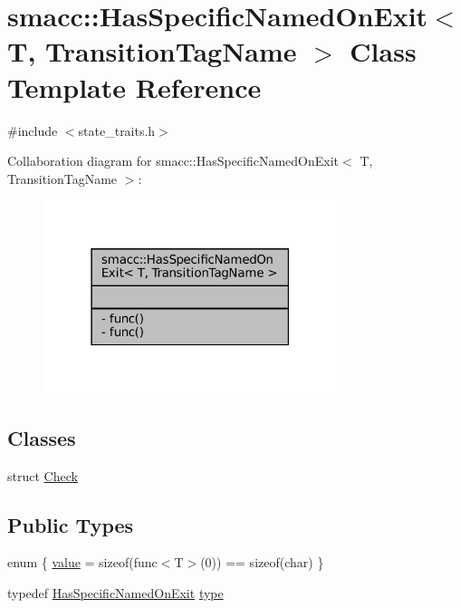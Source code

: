 \hypertarget{classsmacc_1_1HasSpecificNamedOnExit}{}\section{smacc\+:\+:Has\+Specific\+Named\+On\+Exit$<$ T, Transition\+Tag\+Name $>$ Class Template Reference}
\label{classsmacc_1_1HasSpecificNamedOnExit}


{\ttfamily \#include $<$state\+\_\+traits.\+h$>$}



Collaboration diagram for smacc\+:\+:Has\+Specific\+Named\+On\+Exit$<$ T, Transition\+Tag\+Name $>$\+:
\nopagebreak
\begin{figure}[H]
\begin{center}
\leavevmode
\includegraphics[width=243pt]{classsmacc_1_1HasSpecificNamedOnExit__coll__graph}
\end{center}
\end{figure}
\subsection*{Classes}
\begin{DoxyCompactItemize}
\item 
struct \hyperlink{structsmacc_1_1HasSpecificNamedOnExit_1_1Check}{Check}
\end{DoxyCompactItemize}
\subsection*{Public Types}
\begin{DoxyCompactItemize}
\item 
enum \{ \hyperlink{classsmacc_1_1HasSpecificNamedOnExit_aff1a587a8d216597d2dd5b208affc8d0a37b1f8de55f442fbc24c211bacfcccf7}{value} = sizeof(func$<$T$>$(0)) == sizeof(char)
 \}
\item 
typedef \hyperlink{classsmacc_1_1HasSpecificNamedOnExit}{Has\+Specific\+Named\+On\+Exit} \hyperlink{classsmacc_1_1HasSpecificNamedOnExit_a79c051b3a86d6a6c05d4c3420d7147ff}{type}
\end{DoxyCompactItemize}
